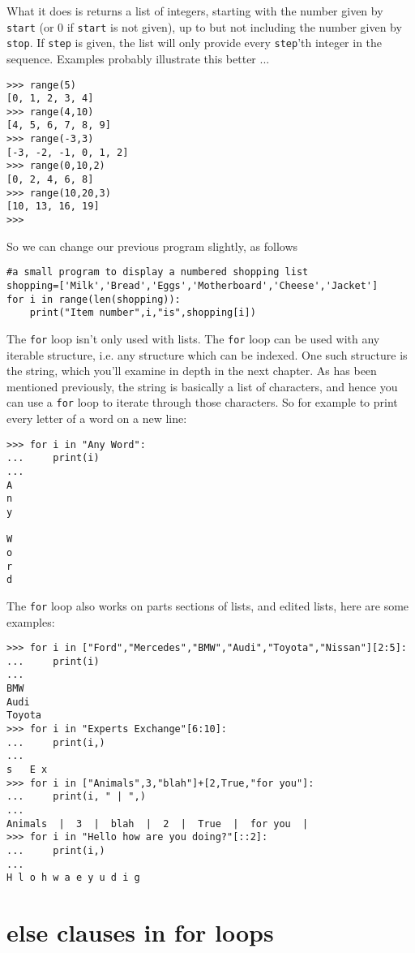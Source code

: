 What it does is returns a list of integers, starting with the number   given by \texttt{start} (or 0 if \texttt{start} is not given), up to but not including   the number given by \texttt{stop}. If \texttt{step} is given, the list will only   provide every \texttt{step}'th integer in the sequence. Examples probably   illustrate this better ...

\begin{lstlisting}
>>> range(5)
[0, 1, 2, 3, 4]
>>> range(4,10)
[4, 5, 6, 7, 8, 9]
>>> range(-3,3)
[-3, -2, -1, 0, 1, 2]
>>> range(0,10,2)
[0, 2, 4, 6, 8]
>>> range(10,20,3)
[10, 13, 16, 19]
>>>
\end{lstlisting}

So we can change our previous program slightly, as follows
\begin{lstlisting}
#a small program to display a numbered shopping list
shopping=['Milk','Bread','Eggs','Motherboard','Cheese','Jacket']
for i in range(len(shopping)):
    print("Item number",i,"is",shopping[i])
\end{lstlisting}

The \texttt{for} loop isn't only used with lists. The \texttt{for} loop can be used with any iterable structure, i.e. any structure which can be indexed. One such structure is the string, which you'll examine in depth in the next chapter. As has been mentioned previously, the string is basically a list of characters, and hence you can use a \texttt{for} loop to iterate through those characters. So for example to print every letter of a word on a new line:   
\begin{lstlisting}
>>> for i in "Any Word":
...     print(i)
... 
A
n
y
 
W
o
r
d
\end{lstlisting}

 The \texttt{for} loop also works on parts sections of lists, and edited lists, here are some examples:
\begin{lstlisting}
>>> for i in ["Ford","Mercedes","BMW","Audi","Toyota","Nissan"][2:5]:
...     print(i)
... 
BMW
Audi
Toyota
>>> for i in "Experts Exchange"[6:10]:
...     print(i,)
... 
s   E x
>>> for i in ["Animals",3,"blah"]+[2,True,"for you"]:
...     print(i, " | ",)
... 
Animals  |  3  |  blah  |  2  |  True  |  for you  | 
>>> for i in "Hello how are you doing?"[::2]:
...     print(i,)
... 
H l o h w a e y u d i g
\end{lstlisting}

\section{else clauses in for loops}

